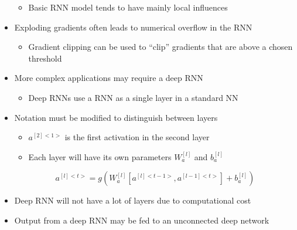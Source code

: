\documentclass[12pt, letterpaper]{article}
\begin{document}
\begin{itemize}
\begin{itemize}
            \item Basic RNN model tends to have mainly local influences
        \end{itemize}
        \item Exploding gradients often leads to numerical overflow in the RNN
        \begin{itemize}
            \item Gradient clipping can be used to ``clip'' gradients that are above a chosen threshold
        \end{itemize}
        \item More complex applications may require a deep RNN
        \begin{itemize}
            \item Deep RNNs use a RNN as a single layer in a standard NN
        \end{itemize}
        \item Notation must be modified to distinguish between layers
        \begin{itemize}
            \item $a^{[2]<1>}$ is the first activation in the second layer
            \item Each layer will have its own parameters $W_a^{[l]}$ and $b_a^{[l]}$
        \end{itemize}
        $$a^{[l]<t>}=g(W_a^{[l]}[a^{[l]<t-1>},a^{[l-1]<t>}]+b_a^[l])$$ 
        \item Deep RNN will not have a lot of layers due to computational cost
        \item Output from a deep RNN may be fed to an unconnected deep network
    \end{itemize}
\end{document}
